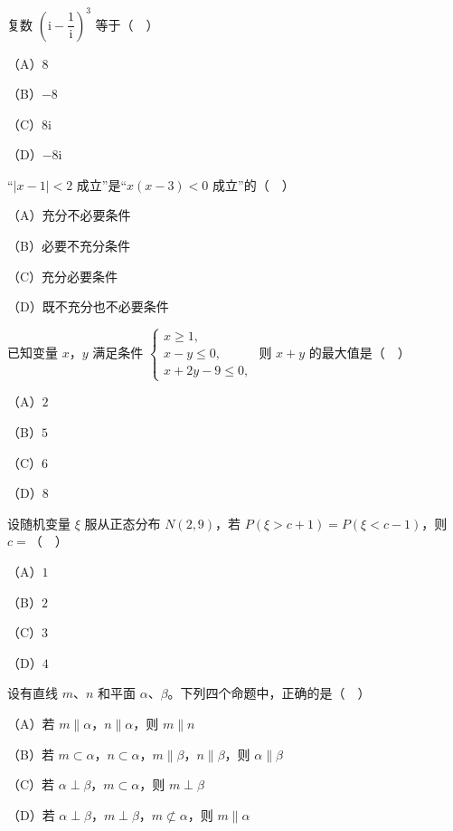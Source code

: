 


\begin{question}
复数 $\left(\mathrm i-\dfrac1{\mathrm i}\right)^3$ 等于（　）

（A）$8$

（B）$-8$

（C）$8\mathrm i$

（D）$-8\mathrm i$

\end{question}
\begin{question}
“$|x-1|<2$ 成立”是“$x(x-3)<0$ 成立”的（　）

（A）充分不必要条件

（B）必要不充分条件

（C）充分必要条件

（D）既不充分也不必要条件

\end{question}
\begin{question}
已知变量 $x$，$y$ 满足条件 $\begin{cases}x\geqslant1,\\ x-y\leqslant0,\\ x+2y-9\leqslant0,\end{cases}$ 则 $x+y$ 的最大值是（　）

（A）$2$

（B）$5$

（C）$6$

（D）$8$

\end{question}
\begin{question}
设随机变量 $\xi$ 服从正态分布 $N(2,9)$，若 $P(\xi>c+1)=P(\xi<c-1)$，则 $c=$（　）

（A）$1$

（B）$2$

（C）$3$

（D）$4$

\end{question}
\begin{question}
设有直线 $m$、$n$ 和平面 $\alpha$、$\beta$。下列四个命题中，正确的是（　）

（A）若 $m\parallel\alpha$，$n\parallel\alpha$，则 $m\parallel n$

（B）若 $m\subset\alpha$，$n\subset\alpha$，$m\parallel\beta$，$n\parallel\beta$，则 $\alpha\parallel\beta$

（C）若 $\alpha\perp\beta$，$m\subset\alpha$，则 $m\perp\beta$

（D）若 $\alpha\perp\beta$，$m\perp\beta$，$m\not\subset\alpha$，则 $m\parallel\alpha$

\end{question}
